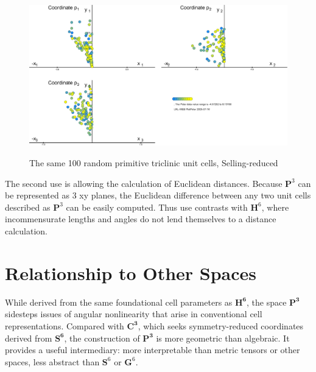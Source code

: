 \documentclass[preprint]{iucr}              %
\numberwithin{equation}{section}
\newcommand{\HVI}{\ensuremath{\mathbf{H}^{6}}}
\newcommand{\GVI}{\ensuremath{\mathbf{G}^{6}}}
\newcommand{\SVI}{\ensuremath{\mathbf{S}^{6}}}
\newcommand{\PIII}{\ensuremath{\mathbf{P}^{3}}}
\begin{document}
\begin{figure}
	\includegraphics[width=\columnwidth]{PlotPolar_Delone}
	\label{PlotPolar_Delone}
	\caption{The same 100 random primitive triclinic unit cells, Selling-reduced}
\end{figure}





The second use is allowing the calculation of Euclidean distances. Because \PIII{} can be represented as 3 xy planes, the Euclidean difference between
any two unit cells described as \PIII{} can be easily computed. Thus use
contrasts with \HVI{}, where incommensurate lengths and angles do not
lend themselves to a distance calculation. 



\section{Relationship to Other Spaces}

While derived from the same foundational cell parameters as $\mathbf{H^6}$, the space $\mathbf{P^3}$ sidesteps issues of angular nonlinearity  that arise in conventional cell representations. Compared with $\mathbf{C^3}$, which seeks symmetry-reduced coordinates derived from $\mathbf{S^6}$, the construction of $\mathbf{P^3}$ is more geometric than algebraic. It provides a useful intermediary: more interpretable than metric tensors or other spaces, less abstract than \SVI{} or \GVI{}.
\end{document}

